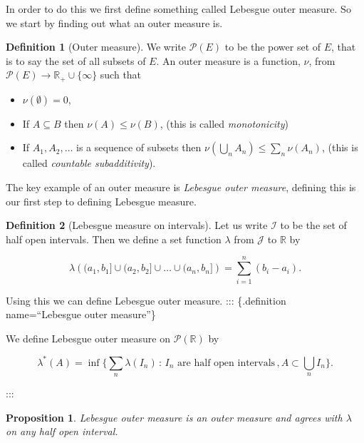 \documentclass[
]{book}
\providecommand{\tightlist}{%
  \setlength{\itemsep}{0pt}\setlength{\parskip}{0pt}}
\newtheorem{proposition}{Proposition}[chapter]
\theoremstyle{definition}
\newtheorem{definition}{Definition}[chapter]
\theoremstyle{definition}
\theoremstyle{definition}
\theoremstyle{definition}
\theoremstyle{remark}
\begin{document}
In order to do this we first define something called Lebesgue outer measure. So we start by finding out what an outer measure is.

\begin{definition}[Outer measure]

We write \(\mathscr{P}(E)\) to be the power set of \(E\), that is to say the set of all subsets of \(E\). An outer measure is a function, \(\nu\), from \(\mathscr{P}(E) \rightarrow \mathbb{R}_+ \cup \{\infty\}\) such that

\begin{itemize}
\tightlist
\item
  \(\nu(\emptyset) =0\),
\item
  If \(A \subseteq B\) then \(\nu (A) \leq \nu(B)\), (this is called \emph{monotonicity})
\item
  If \(A_1, A_2, \dots\) is a sequence of subsets then \(\nu\left( \bigcup_n A_n \right) \leq \sum_n \nu(A_n)\), (this is called \emph{countable subadditivity}).
\end{itemize}

\end{definition}

The key example of an outer measure is \emph{Lebesgue outer measure}, defining this is our first step to defining Lebesgue measure.

\begin{definition}[Lebesgue measure on intervals]
Let us write \(\mathcal{I}\) to be the set of half open intervals. Then we define a set function \(\lambda\) from \(\mathcal{J}\) to \(\mathbb{R}\) by

\[ \lambda \left(  (a_1, b_1] \cup (a_2,b_2] \cup \dots \cup (a_n,b_n] \right) = \sum_{i=1}^n (b_i-a_i).\]
\end{definition}

Using this we can define Lebesgue outer measure.
::: \{.definition name=``Lebesgue outer measure''\}

We define Lebesgue outer measure on \(\mathscr{P}(\mathbb{R})\) by

\[\lambda^* (A) = \inf \{ \sum_n\lambda (I_n) \, : \, \mbox{$I_n$ are half open intervals}\, , A \subset \bigcup_n I_n\}. \]

:::

\begin{proposition}
Lebesgue outer measure is an outer measure and agrees with \(\lambda\) on any half open interval.
\end{proposition}
\end{document}
